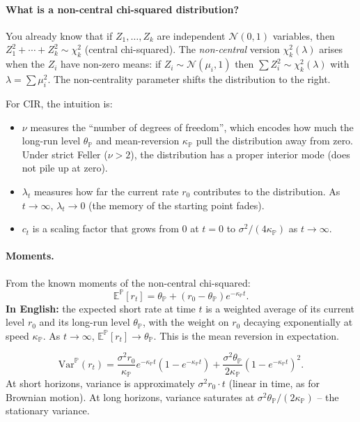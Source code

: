 \documentclass[11pt]{article}
\newcommand{\PP}{\mathbb{P}}
\newcommand{\EE}{\mathbb{E}}
\newcommand{\NN}{\mathcal{N}}
\begin{document}
\paragraph{What is a non-central chi-squared distribution?}
You already know that if $Z_1,\ldots,Z_k$ are independent $\NN(0,1)$
variables, then $Z_1^2+\cdots+Z_k^2 \sim \chi^2_k$ (central chi-squared).
The \emph{non-central} version $\chi^2_k(\lambda)$ arises when the $Z_i$
have non-zero means: if $Z_i \sim \NN(\mu_i,1)$ then $\sum Z_i^2 \sim
\chi^2_k(\lambda)$ with $\lambda = \sum \mu_i^2$.  The non-centrality
parameter shifts the distribution to the right.

For CIR, the intuition is:
\begin{itemize}
  \item $\nu$ measures the ``number of degrees of freedom'', which encodes
  how much the long-run level $\theta_\PP$ and mean-reversion $\kappa_\PP$
  pull the distribution away from zero.  Under strict Feller ($\nu > 2$),
  the distribution has a proper interior mode (does not pile up at zero).
  \item $\lambda_t$ measures how far the current rate $r_0$ contributes to
  the distribution.  As $t \to \infty$, $\lambda_t \to 0$ (the memory of
  the starting point fades).
  \item $c_t$ is a scaling factor that grows from $0$ at $t=0$ to
  $\sigma^2/(4\kappa_\PP)$ as $t\to\infty$.
\end{itemize}

\paragraph{Moments.}  From the known moments of the non-central
chi-squared:
\[
\EE^\PP[r_t] = \theta_\PP + (r_0-\theta_\PP)e^{-\kappa_\PP t}.
\]
\textbf{In English:} the expected short rate at time $t$ is a weighted
average of its current level $r_0$ and its long-run level $\theta_\PP$,
with the weight on $r_0$ decaying exponentially at speed $\kappa_\PP$.
As $t \to \infty$, $\EE^\PP[r_t] \to \theta_\PP$.  This is the mean
reversion in expectation.

\[
\mathrm{Var}^\PP(r_t)
= \frac{\sigma^2 r_0}{\kappa_\PP}e^{-\kappa_\PP t}(1-e^{-\kappa_\PP t})
+ \frac{\sigma^2\theta_\PP}{2\kappa_\PP}(1-e^{-\kappa_\PP t})^2.
\]
At short horizons, variance is approximately $\sigma^2 r_0 \cdot t$ (linear
in time, as for Brownian motion).  At long horizons, variance saturates at
$\sigma^2\theta_\PP/(2\kappa_\PP)$ -- the stationary variance.
\end{document}
